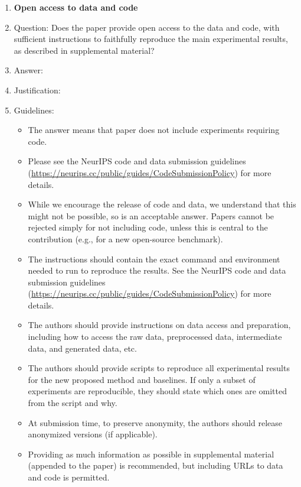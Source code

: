 \documentclass{article}
\theoremstyle{plain}
\theoremstyle{definition}
\theoremstyle{remark}
\begin{document}
\begin{enumerate}
\item {\bf Open access to data and code}
    \item[] Question: Does the paper provide open access to the data and code, with sufficient instructions to faithfully reproduce the main experimental results, as described in supplemental material?
    \item[] Answer: \answerTODO{} %
    \item[] Justification: \justificationTODO{}
    \item[] Guidelines:
    \begin{itemize}
        \item The answer \answerNA{} means that paper does not include experiments requiring code.
        \item Please see the NeurIPS code and data submission guidelines (\url{https://neurips.cc/public/guides/CodeSubmissionPolicy}) for more details.
        \item While we encourage the release of code and data, we understand that this might not be possible, so \answerNo{} is an acceptable answer. Papers cannot be rejected simply for not including code, unless this is central to the contribution (e.g., for a new open-source benchmark).
        \item The instructions should contain the exact command and environment needed to run to reproduce the results. See the NeurIPS code and data submission guidelines (\url{https://neurips.cc/public/guides/CodeSubmissionPolicy}) for more details.
        \item The authors should provide instructions on data access and preparation, including how to access the raw data, preprocessed data, intermediate data, and generated data, etc.
        \item The authors should provide scripts to reproduce all experimental results for the new proposed method and baselines. If only a subset of experiments are reproducible, they should state which ones are omitted from the script and why.
        \item At submission time, to preserve anonymity, the authors should release anonymized versions (if applicable).
        \item Providing as much information as possible in supplemental material (appended to the paper) is recommended, but including URLs to data and code is permitted.
    \end{itemize}



\end{enumerate}
\end{document}
